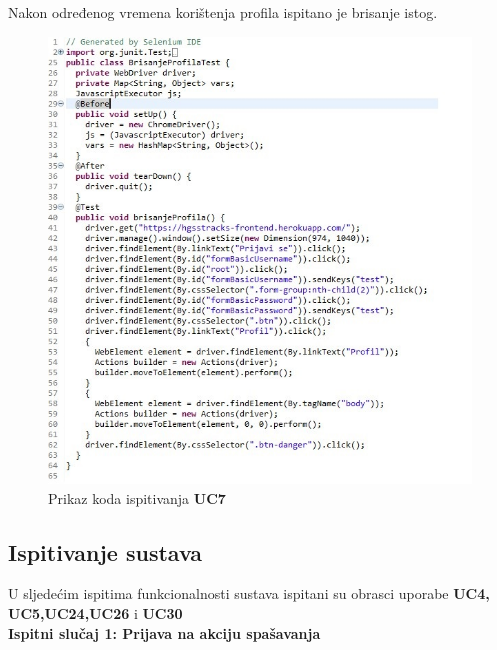 			\begin{packed_item}
				\item {Nakon određenog vremena korištenja profila ispitano je brisanje istog.}\\
				
				\begin{figure}[h!]
					\centering
					\includegraphics[width=\linewidth]{./slike/BrisanjeProfila.jpg}
					\caption{Prikaz koda ispitivanja \textbf{UC7}}
				\end{figure}
				\eject
			\end{packed_item}
			
			
			
			
			
			
			
			\subsection{Ispitivanje sustava}
			
			 {U sljedećim ispitima funkcionalnosti sustava ispitani su obrasci uporabe \textbf{UC4, UC5,UC24,UC26} i \textbf{UC30}}\\
			 
			 \textbf{Ispitni slučaj 1: Prijava na akciju spašavanja}
			 
